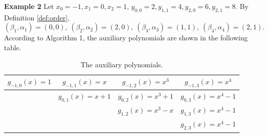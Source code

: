 \documentclass[preprint,12pt]{elsarticle}
\begin{document}
\noindent\textbf{Example 2}
Let $x_0=-1, x_1=0, x_2=1$, $y_{0,0}=2, y_{1,1}=4, y_{2,0}=6, y_{2,1}=8$.
By Definition \ref{def:order},
\begin{displaymath}
(\beta_1,\alpha_1)=(0,0),\ (\beta_2,\alpha_2)=(2,0),\ (\beta_3,\alpha_3)=(1,1),\ (\beta_4,\alpha_4)=(2,1).
\end{displaymath}
According to Algorithm 1, the auxiliary polynomials are shown in the following table.
\begin{table}[ht]
\centering
\caption{The auxiliary polynomials.}\label{tbl2}
\begin{tabular}{c c c c}
\toprule
\(g_{-1,0}(x)=1\) & \(g_{-1,1}(x)=x\) & \(g_{-1,2}(x)=x^3\) & \(g_{-1,3}(x)=x^4\) \\
\midrule
 & \(g_{0,1}(x)=x+1\) & \(g_{0,2}(x)=x^3+1\) & \(g_{0,3}(x)=x^4-1\) \\
 &  & \(g_{1,2}(x)=x^3-x\) & \(g_{1,3}(x)=x^4-1\) \\
 &  &  & \(g_{2,3}(x)=x^4-1\) \\
\bottomrule
\end{tabular}
\end{table}
\end{document}
